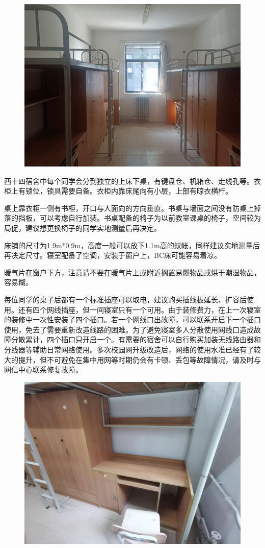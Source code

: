 \documentclass[
decoration,  %
]{qyxf-book}
\begin{document}
	\begin{figure}[!h]
		\centering
		\includegraphics[width=0.8\linewidth]{pics/chp2_west10_dorm_inside}
	\end{figure}
	
	
	西十四宿舍中每个同学会分到独立的上床下桌，有键盘仓、机箱仓、走线孔等。衣柜上有锁位，锁具需要自备。衣柜内靠床尾向有小层，上部有晾衣横杆。
	
	桌上靠衣柜一侧有书柜，开口与人面向的方向垂直。书桌与墙面之间没有防桌上掉落的挡板，可以考虑自行加装。书桌配备的椅子为以前教室课桌的椅子，空间较为局促，建议想更换椅子的同学实地测量后再决定。
	
	床铺的尺寸为1.9m*0.9m，高度一般可以放下1.1m高的蚊帐，同样建议实地测量后再决定尺寸。寝室配备了空调，安装于窗户上，BC床可能容易着凉。
	
	暖气片在窗户下方，注意请不要在暖气片上或附近搁置易燃物品或烘干潮湿物品，容易糊。
	
	每位同学的桌子后都有一个标准插座可以取电，建议购买插线板延长、扩容后使用。还有四个网线插座，但一间寝室只有一个可用。由于装修费力，在上一次寝室的装修中一次性安装了四个插口。若一个网线口出故障，可以联系开启下一个插口使用，免去了需要重新改造线路的困难。为了避免寝室多人分散使用网线口造成故障分散累计，四个插口只开启一个。有需要的宿舍可以自行购买加装无线路由器和分线器等辅助日常网络使用。多次校园网升级改造后，网络的使用水准已经有了较大的提升，但不可避免在集中用网等时期仍会有卡顿、丢包等故障情况，请及时与网信中心联系修复故障。

	
	\begin{figure}[!h]
		\centering
		\includegraphics[width=0.8\linewidth]{pics/chp2_west14_dorm_desk}
	\end{figure}
	\vspace {-1.5em}
\end{document}

